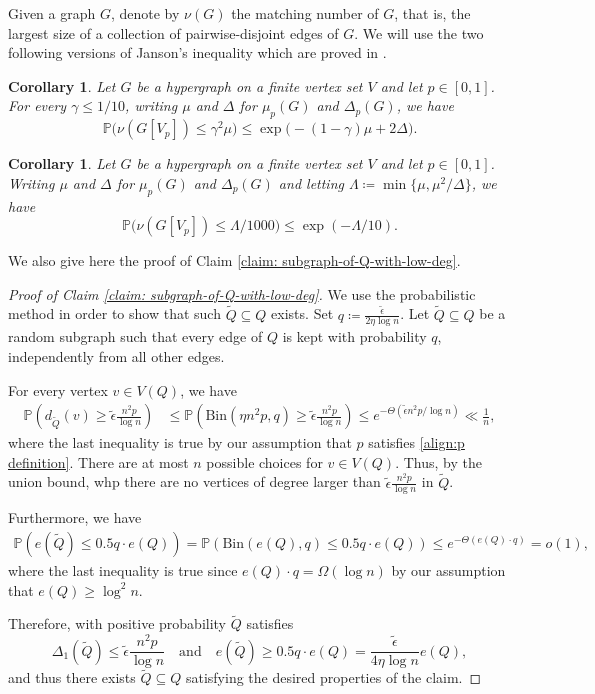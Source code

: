 \documentclass[11pt,a4paper,oneside,reqno]{amsart}
\newtheorem{cor}[thm]{Corollary}
\renewcommand{\Pr}{\mathbb{P}}
\newcommand{\1}{\mathbbm{1}} %
\renewcommand{\le}{\leqslant}
\renewcommand{\ge}{\geqslant}
\begin{document}
Given a graph $G$, denote by $\nu(G)$ the matching number of $G$, that is, the largest size of a collection of pairwise-disjoint edges of $G$. We will use the two following versions of Janson's inequality which are proved in \cite{hoshen2023simonovits}.

\begin{cor}
  \label{cor:Janson-matchings}
  Let $G$ be a hypergraph on a finite vertex set $V$ and let $p \in [0,1]$.
  For every $\gamma \le 1/10$, writing $\mu$ and $\Delta$ for $\mu_p(G)$ and $\Delta_p(G)$, we have
  \[
    \Pr\big(\nu(G[V_p]) \le \gamma^2 \mu\big) \le \exp\big(-(1 - \gamma)\mu + 2 \Delta\big).
  \]
\end{cor}

\begin{cor}
  \label{cor:extended-Janson-matchings}  
  Let $G$ be a hypergraph on a finite vertex set $V$ and let $p \in [0,1]$.
  Writing $\mu$ and $\Delta$ for $\mu_p(G)$ and $\Delta_p(G)$ and letting $\Lambda \coloneqq \min\{\mu, \mu^2 / \Delta\}$, we have
  \[
    \Pr\big(\nu(G[V_p]) \le \Lambda/1000\big) \le \exp(-\Lambda/10).
  \]
\end{cor}

We also give here the proof of Claim \ref{claim: subgraph-of-Q-with-low-deg}.
\begin{proof}[Proof of Claim \ref{claim: subgraph-of-Q-with-low-deg}]
    We use the probabilistic method in order to show that such $\tilde{Q} \subseteq Q$ exists. Set $q \coloneqq \frac{\tilde{\epsilon}}{2\eta \log n}$. Let $\tilde{Q} \subseteq Q$ be a random subgraph such that every edge of $Q$ is kept with probability $q$, independently from all other edges.

    For every vertex $v \in V(Q)$, we have
    \begin{align*}
        \Pr\left(d_{\tilde{Q}}\left(v\right) \ge \tilde{\epsilon} \frac{n^2 p}{\log n}\right) &\le \Pr\left(\text{Bin}\left(\eta n^2 p, q\right) \ge \tilde{\epsilon} \frac{n^2 p}{\log n}\right) \le e^{-\Theta(\tilde{\epsilon} n^2 p / \log n)} \ll \frac{1}{n},
    \end{align*}
    where the last inequality is true by our assumption that $p$ satisfies \eqref{align:p definition}. There are at most $n$ possible choices for $v \in V(Q)$. Thus, by the union bound, whp there are no vertices of degree larger than $\tilde{\epsilon} \frac{n^2 p}{\log n}$ in $\tilde{Q}$.
    
    Furthermore, we have
    \begin{align*}
        \Pr\left(e(\tilde{Q}) \le 0.5 q \cdot e(Q)\right) = \Pr\left(\text{Bin}(e(Q), q) \le 0.5 q \cdot e(Q)\right) \le e^{-\Theta(e(Q) \cdot q)} = o(1),
    \end{align*}
    where the last inequality is true since $e(Q) \cdot q = \Omega(\log n)$ by our assumption that $e(Q) \ge \log^2 n$.

    Therefore, with positive probability $\tilde{Q}$ satisfies 
    \[
        \Delta_1(\tilde{Q}) \le \tilde{\epsilon} \frac{n^2 p}{\log n} \quad \text{and} \quad e(\tilde{Q}) \ge 0.5 q \cdot e(Q) = \frac{\tilde{\epsilon}}{4 \eta \log n} e(Q),
    \]
    and thus there exists $\tilde{Q} \subseteq Q$ satisfying the desired properties of the claim.
\end{proof}
\end{document}
